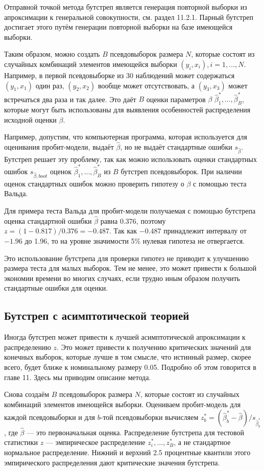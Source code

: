 Отправной точкой метода бутстреп является генерация повторной выборки из апроксимации к генеральной совокупности, см. раздел 11.2.1. Парный бутстреп достигает этого путём генерации повторной выборки на базе имеющейся выборки.

Таким образом, можно создать $B$ псевдовыборок размера $N$, которые состоят из случайных комбинаций элементов имеющейся выборки $(y_i, x_i), i = 1, \dots, N$. Например, в первой псевдовыборке из 30 наблюдений может содержаться $(y_1, x_1)$ один раз, $(y_2, x_2)$ вообще может отсутствовать, а $(y_3, x_3)$ может встречаться два раза и так далее. Это даёт $B$ оценки параметров $\beta$ $\hat{\beta}_1^*, \dots, \hat{\beta}_B^*$, которые могут быть использованы для выявления особенностей распределения исходной оценки $\beta$. 

Например, допустим, что компьютерная программа, которая используется для оценивания пробит-модели, выдаёт $\hat{\beta}$, но не выдаёт стандартные ошибки $s_{\hat{\beta}}$. Бутстреп решает эту проблему, так как можно использовать оценки стандартных ошибок $s_{\hat{\beta}, boot}$ оценок $\hat{\beta}_1^*, \dots, \hat{\beta}_B^*$ из $B$ бутстреп псевдовыборок. При наличии оценок стандартных ошибок можно проверить гипотезу о $\beta$  с помощью теста Вальда.

Для примера теста Вальда для пробит-модели получаемая с помощью бутстрепа оценка стандартной ошибки $\hat{\beta}$ равна 0.376, поэтому $z = (1 - 0.817) / 0.376 = - 0.487$. Так как $- 0.487$ принадлежит интервалу от $- 1.96$ до 1.96, то на уровне значимости 5\% нулевая гипотеза не отвергается.

Это использование бутстрепа для проверки гипотез не приводит к улучшению размера теста для малых выборок. Тем не менее, это может привести к большой экономии времени во многих случаях, если трудно иным образом получить стандартные ошибки для оценки.

\subsection{Бутстреп с асимптотической теорией}

Иногда бутстреп может привести к лучшей асимптотической апроксимации к распределению $z$. Это может привести к получению критических значений для конечных выборок, которые лучше в том смысле, что истинный размер, скорее всего, будет ближе к номинальному размеру 0.05. Подробно об этом говорится в главе 11. Здесь мы приводим описание метода.

Снова создаём $B$ псевдовыборок размера $N$, которые состоят из случайных комбинаций элементов имеющейся выборки. Оцениваем пробит-модель для каждой псевдовыборки и для $b$-той псевдовыборки вычисляем $z_b^* = (\hat{\beta}_b^* - \hat{\beta}) / s_{\hat{\beta}_b^*}$, где $\hat{\beta}$ --- это первоначальная оценка. Распределение бутстрепа для тестовой статистики $z$ --- эмпирическое распределение $z_i^*, \dots, z_B^*$, а не стандартное нормальное распределение. Нижний и верхний 2.5 процентные квантили этого эмпирического распределения дают критические значения бутстрепа.

